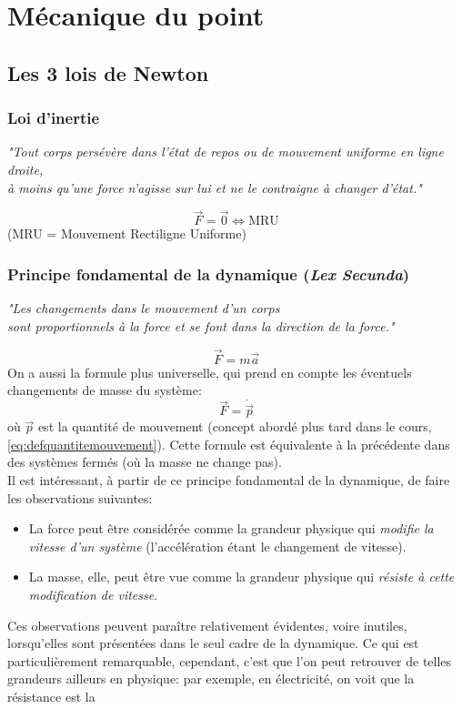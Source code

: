 \documentclass{article}
\numberwithin{equation}{section}
\begin{document}
\section{Mécanique du point}

\subsection{Les 3 lois de Newton}

\subsubsection{Loi d'inertie}
\begin{center}
	\emph{"Tout corps persévère dans l'état de repos ou de mouvement uniforme en ligne droite, \\
	 à moins qu'une force n'agisse sur lui et ne le contraigne à changer d'état."}
\end{center}
\begin{equation}
	\boxed{\vec F = \vec 0 \Leftrightarrow \text{MRU}}
\end{equation}
(MRU = Mouvement Rectiligne Uniforme)

\subsubsection{Principe fondamental de la dynamique (\emph{Lex Secunda})}
\begin{center}
	\emph{"Les changements dans le mouvement d'un corps \\ sont proportionnels à la force et se font dans la direction de la force."}
\end{center}
\begin{equation} \label{eq:lexsecunda}
	\boxed{\vec F = m \vec a}
\end{equation}
On a aussi la formule plus universelle, qui prend en compte les éventuels changements de masse du système:
\begin{equation*}
	\boxed{ \vec F = \dot{\vec p} }
\end{equation*}
où \(\vec p\) est la quantité de mouvement (concept abordé plus tard dans le cours, \ref{eq:defquantitemouvement}). Cette formule est équivalente à la précédente dans des systèmes fermés (où la masse ne change pas). \\

Il est intéressant, à partir de ce principe fondamental de la dynamique, de faire les observations suivantes:
\begin{itemize}
	\item La force peut être considérée comme la grandeur physique qui \emph{modifie la vitesse d'un système} (l'accélération étant le changement de vitesse).
	\item La masse, elle, peut être vue comme la grandeur physique qui \emph{résiste à cette modification de vitesse}.
\end{itemize}
Ces observations peuvent paraître relativement évidentes, voire inutiles, lorsqu'elles sont présentées dans le seul cadre de la dynamique. Ce qui est particulièrement remarquable, cependant, c'est que l'on peut retrouver de telles grandeurs ailleurs en physique: par exemple, en électricité, on voit que la résistance est la 
\end{document}

